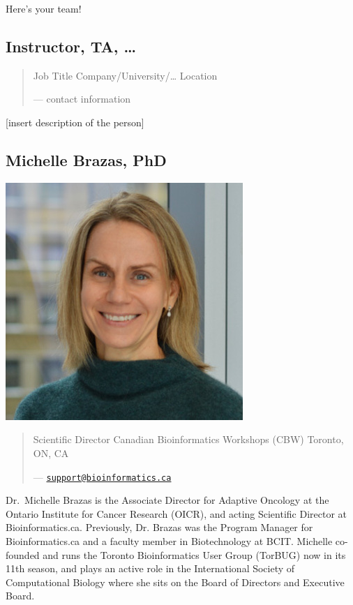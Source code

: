 \documentclass[
]{book}
\begin{document}
Here's your team!

\subsection{Instructor, TA, \ldots{}}\label{instructor-ta}

\begin{quote}
Job Title
Company/University/\ldots{}
Location

--- contact information
\end{quote}

{[}insert description of the person{]}

\subsection{Michelle Brazas, PhD}\label{michelle-brazas-phd}

\includegraphics{./img/faculty/michelle-brazas.jpg}\\

\begin{quote}
Scientific Director
Canadian Bioinformatics Workshops (CBW)
Toronto, ON, CA

--- \href{mailto:support@bioinformatics.ca}{\nolinkurl{support@bioinformatics.ca}}
\end{quote}

Dr.~Michelle Brazas is the Associate Director for Adaptive Oncology at the Ontario Institute for
Cancer Research (OICR), and acting Scientific Director at Bioinformatics.ca. Previously, Dr.
Brazas was the Program Manager for Bioinformatics.ca and a faculty member in
Biotechnology at BCIT. Michelle co-founded and runs the Toronto Bioinformatics User Group
(TorBUG) now in its 11th season, and plays an active role in the International Society of
Computational Biology where she sits on the Board of Directors and Executive Board.
\end{document}
